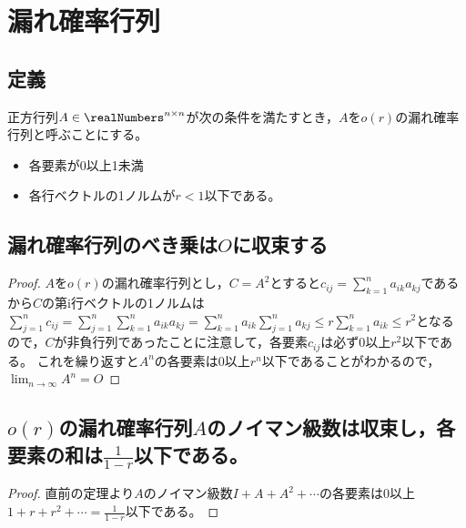 \chapter{漏れ確率行列}
    \section{定義}
        \begin{shadebox}
            正方行列$A\in\realNumbers^{n\times n}$が次の条件を満たすとき，$A$を$o(r)$の漏れ確率行列と呼ぶことにする。
            \begin{itemize}
                \item 各要素が0以上1未満
                \item 各行ベクトルの1ノルムが$r<1$以下である。
            \end{itemize}
        \end{shadebox}
    \section{漏れ確率行列のべき乗は\texorpdfstring{$O$}{O}に収束する}
        \begin{proof}
            $A$を$o(r)$の漏れ確率行列とし，$C=A^2$とすると$c_{ij} = \sum_{k=1}^{n}{a_{ik}a_{kj}}$であるから$C$の第i行ベクトルの1ノルムは
            $\sum_{j=1}^{n}{c_{ij}} = \sum_{j=1}^{n}{\sum_{k=1}^{n}{a_{ik}a_{kj}}} = \sum_{k=1}^{n}{a_{ik}\sum_{j=1}^{n}{a_{kj}}} \leq r\sum_{k=1}^{n}{a_{ik}} \leq r^2$となるので，$C$が非負行列であったことに注意して，各要素$c_{ij}$は必ず0以上$r^2$以下である。
            これを繰り返すと$A^n$の各要素は0以上$r^n$以下であることがわかるので，$\lim_{n\rightarrow\infty}{A^n}=O$
        \end{proof}
    \section{\texorpdfstring{$o(r)$}{o(r)}の漏れ確率行列\texorpdfstring{$A$}{A}のノイマン級数は収束し，各要素の和は\texorpdfstring{$\frac{1}{1-r}$}{1/(1-r)}以下である。}
        \begin{proof}
            直前の定理より$A$のノイマン級数$I+A+A^2+\dotsb$の各要素は0以上$1+r+r^2+\dotsb=\frac{1}{1-r}$以下である。
        \end{proof}